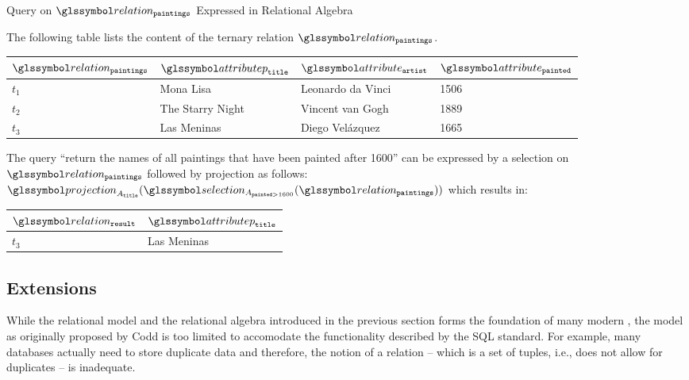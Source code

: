 \begin{example}[label=example:rel_alg_query]{Query on $\relation_{\mathtt{paintings}}$ Expressed in Relational Algebra}{}
    
    The following table lists the content of the ternary relation $\relation_{\mathtt{paintings}}$. 
        
    \begin{center}
        \begin{tabular}{ l || l | l | l |}
            $\relation_{\mathtt{paintings}}$ & $\attributep_{\mathtt{title}}$  & $\attribute_{\mathtt{artist}}$  & $\attribute_{\mathtt{painted}}$ \\ 
            \hline
            \hline
            $t_1$ & Mona Lisa &  Leonardo da Vinci & 1506 \\
            \hline
            $t_2$ & The Starry Night & Vincent van Gogh & 1889 \\
            \hline
            $t_3$ & Las Meninas & Diego Velázquez & 1665 \\
            \hline
        \end{tabular}
    \end{center}

    The query ``return the names of all paintings that have been painted after 1600'' can be expressed by a selection on $\relation_{\mathtt{paintings}}$ followed by projection as follows: $\projection_{A_{\mathtt{title}}} ( \selection_{A_{\mathtt{painted} > 1600}} ( \relation_{\mathtt{paintings}}))$ which results in: 

    \begin{center}
        \begin{tabular}{ l || l |}
            $\relation_{\mathtt{result}}$ & $\attributep_{\mathtt{title}}$  \\ 
            \hline
            \hline
            $t_3$ & Las Meninas \\
            \hline
        \end{tabular}
    \end{center}
\end{example}

\subsection{Extensions}
\label{section:rel_extensions}

While the relational model and the relational algebra introduced in the previous section forms the foundation of many modern , the model as originally proposed by Codd is too limited to accomodate the functionality described by the SQL standard. For example, many databases actually need to store duplicate data and therefore, the notion of a relation -- which is a set of tuples, i.e., does not allow for duplicates -- is inadequate. 

